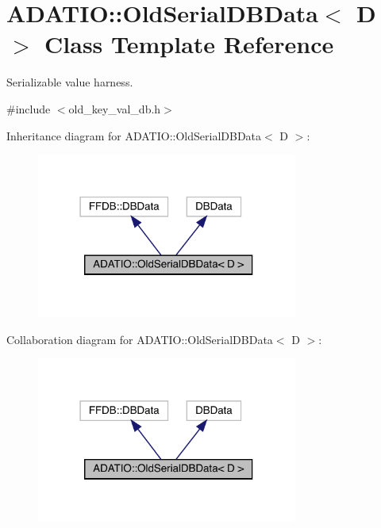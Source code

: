 \hypertarget{classADATIO_1_1OldSerialDBData}{}\section{A\+D\+A\+T\+IO\+:\+:Old\+Serial\+D\+B\+Data$<$ D $>$ Class Template Reference}
\label{classADATIO_1_1OldSerialDBData}


Serializable value harness.  




{\ttfamily \#include $<$old\+\_\+key\+\_\+val\+\_\+db.\+h$>$}



Inheritance diagram for A\+D\+A\+T\+IO\+:\+:Old\+Serial\+D\+B\+Data$<$ D $>$\+:\nopagebreak
\begin{figure}[H]
\begin{center}
\leavevmode
\includegraphics[width=243pt]{de/d33/classADATIO_1_1OldSerialDBData__inherit__graph}
\end{center}
\end{figure}


Collaboration diagram for A\+D\+A\+T\+IO\+:\+:Old\+Serial\+D\+B\+Data$<$ D $>$\+:\nopagebreak
\begin{figure}[H]
\begin{center}
\leavevmode
\includegraphics[width=243pt]{d4/d68/classADATIO_1_1OldSerialDBData__coll__graph}
\end{center}
\end{figure}
